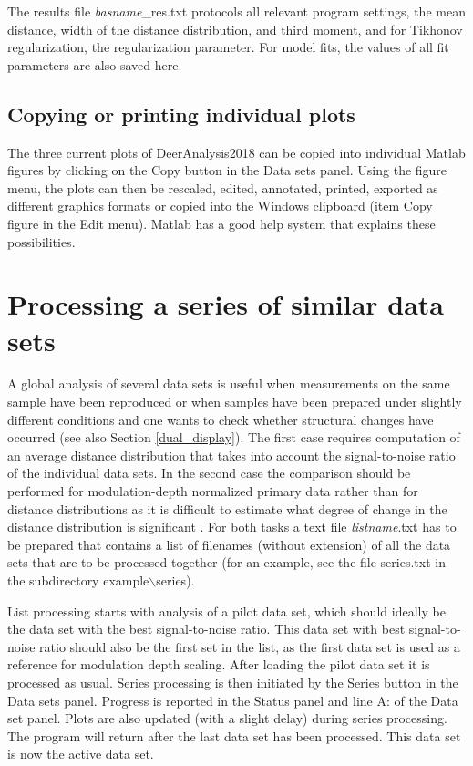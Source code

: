\documentclass{article}
\begin{document}
The results file {\ttfamily \emph{basname}\_res.txt} protocols all relevant program settings,
the mean distance, width of the distance distribution, and third moment,
and for Tikhonov regularization, the regularization parameter. For model fits, the values of all fit parameters are also saved here.

\subsection{Copying or printing individual plots}
The three current plots of DeerAnalysis2018 can be copied into individual Matlab figures by clicking on the {\ttfamily Copy} button in the {\ttfamily Data sets} panel. Using the figure menu, the plots can then be rescaled, edited, annotated, printed, exported as different graphics formats or copied into the Windows clipboard (item {\ttfamily Copy figure} in the {\ttfamily Edit} menu). Matlab has a good help system that explains these possibilities.  

\section{Processing a series of similar data sets}
\label{series}

A global analysis of several data sets is useful when measurements on the same sample have been reproduced or when samples have been prepared under slightly different conditions and one wants to check whether structural changes have occurred (see also Section \ref{dual_display}). The first case requires computation of an average distance distribution that takes into account the signal-to-noise ratio of the individual data sets. In the second case the comparison should be performed for modulation-depth normalized primary data rather than for distance distributions as it is difficult to estimate what degree of change in the distance distribution is significant \cite{jeschke2004a}. For both tasks a text file {\ttfamily \emph{listname}.txt} has to be prepared that contains a list of filenames (without extension) of all the data sets that are to be processed together (for an example, see the file {\ttfamily series.txt} in the subdirectory {\ttfamily example$\backslash$series}).

List processing starts with analysis of a pilot data set, which should ideally be the data set with the best signal-to-noise ratio. This data set with best signal-to-noise ratio should also be the first set in the list, as the first data set is used as a reference for modulation depth scaling. After loading the pilot data set it is processed as usual. Series processing is then initiated by the {\ttfamily Series} button in the {\ttfamily Data sets} panel. Progress is reported in the {\ttfamily Status} panel and line {\ttfamily A:} of the {\ttfamily Data set} panel. Plots are also updated (with a slight delay) during series processing. The program will return after the last data set has been processed. This data set is now the active data set.
\end{document}
